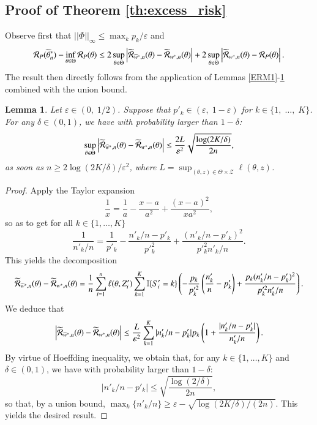 \documentclass[12pt]{article}
\newtheorem{lemma}{{\bf Lemma}}
\newcommand{\cR}{{\cal R}}
\begin{document}
\subsection*{Proof of Theorem \ref{th:excess_risk} }

Observe first that $\vert\vert \Phi \vert\vert_{\infty}\leq \max_k p_k/\varepsilon$ and
$$
\cR_P(\widetilde{\theta}^*_n)-\inf_{\theta\in\Theta}\cR_P(\theta)\leq 2\sup_{\theta\in \Theta}\left\vert  \widetilde{\cR}_{\widehat{w}^*,n}(\theta)-    \widetilde{\cR}_{w^*,n}(\theta) \right\vert + 2\sup_{\theta\in \Theta}\left\vert  \widetilde{\cR}_{w^*,n}(\theta)-    \cR_{P}(\theta) \right\vert.
$$
The result then directly follows from the application of Lemmas \ref{ERM1}-\ref{lem:approx2} combined with the union bound.

\begin{lemma}
  \label{lem:approx2}
  Let $\varepsilon\in(0,\; 1/2)$. Suppose that $p'_k\in (\varepsilon,\; 1-\varepsilon)$ for $k\in\{1,\; \ldots,\; K\}$. For any $\delta\in (0,1)$, we have with probability larger than $1-\delta$:
  $$
  \sup_{\theta \in \Theta}\left\vert  \widetilde{\cR}_{\widehat{w}^*,n}(\theta)-    \widetilde{\cR}_{w^*,n}(\theta) \right\vert \leq \frac{2L}{\varepsilon^2} \sqrt{\frac{\log (2K/\delta)}{2n}},
  $$
  as soon as $n\geq 2\log(2K/\delta)/\varepsilon^2$, where $L=\sup_{(\theta, z) \in \Theta \times \mathcal{Z}} \ell(\theta, z)$.
\end{lemma}

\begin{proof}

Apply the Taylor expansion
$$
\frac{1}{x}=\frac{1}{a}-\frac{x-a}{a^2}+\frac{(x-a)^2}{xa^2},
$$
so as to get for all $k\in\{1, \dots, K\}$
\begin{equation*}
\frac{1}{n'_k/n}=\frac{1}{p'_k}-\frac{n'_k/n-p'_k}{p'^2_k}+\frac{(n'_k/n-p'_k)^2}{p'^2_k n'_k/n}.
\end{equation*}
This yields the decomposition
\begin{equation*}
\widetilde{\cR}_{\widehat{w}^*,n}(\theta)-\widetilde{\cR}_{w^*,n}(\theta)
= \frac{1}{n} \sum_{i=1}^n \ell(\theta, Z'_i) \sum_{k=1}^K \mathbb{I}\{S'_i=k \} \left( -\frac{p_k}{p'^2_k}\left(\frac{n'_k}{n}-p'_k\right) + \frac{p_k(n'_k/n-p'_k)^2}{p'^2_k n'_k/n} \right).
\end{equation*}
We deduce that
\begin{equation*}
\left\vert
\widetilde{\cR}_{\widehat{w}^*,n}(\theta)-\widetilde{\cR}_{w^*,n}(\theta)
\right\vert \leq \frac{L}{\varepsilon^2} \sum_{k=1}^K \vert n'_k/n-p'_k\vert p_k \left( 1 + \frac{\vert n'_k/n-p'_k\vert}{n'_k/n} \right).
\end{equation*}
By virtue of Hoeffding inequality, we obtain that, for any $k\in\{1,\dots, K\}$ and $\delta\in (0,1)$, we have with probability larger than $1-\delta$:
$$
\left\vert n'_k/n-p'_k\right\vert \leq \sqrt{\frac{\log(2/\delta)}{2n}},
$$
so that, by a union bound, $\max_k \{ n'_k/n \}\geq \varepsilon-\sqrt{\log(2K/\delta)/(2n)}$. This yields the desired result.

\end{proof}
\end{document}
